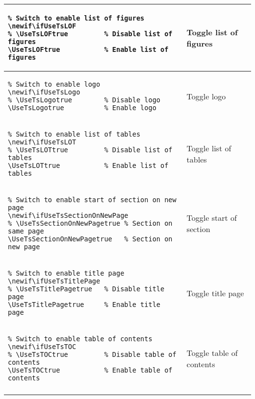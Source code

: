 \begin{footnotesize}
\begin{longtable}{ | P{0.7\textwidth} | p{0.23\textwidth} | }
        \hline
        \begin{BVerbatim}
\newif\ifUseTsLOF
\UseTsLOFtrue           %
        \end{BVerbatim}
         & Toggle list \newline of figures   \\
        \hline
        \begin{BVerbatim}
\newif\ifUseTsLogo
\UseTsLogotrue          %
        \end{BVerbatim}
         & Toggle logo                       \\
        \hline
        \begin{BVerbatim}
\newif\ifUseTsLOT
\UseTsLOTtrue           %
        \end{BVerbatim}
         & Toggle list \newline of tables    \\
        \hline
        \begin{BVerbatim}
\newif\ifUseTsSectionOnNewPage
\UseTsSectionOnNewPagetrue   %
        \end{BVerbatim}
         & Toggle start \newline of section  \\
        \hline
        \begin{BVerbatim}
\newif\ifUseTsTitlePage
\UseTsTitlePagetrue     %
        \end{BVerbatim}
         & Toggle title page                 \\
        \hline
        \begin{BVerbatim}
\newif\ifUseTsTOC
\UseTsTOCtrue           %
        \end{BVerbatim}
         & Toggle table \newline of contents \\
        \hline
    \end{longtable}
\end{footnotesize}

